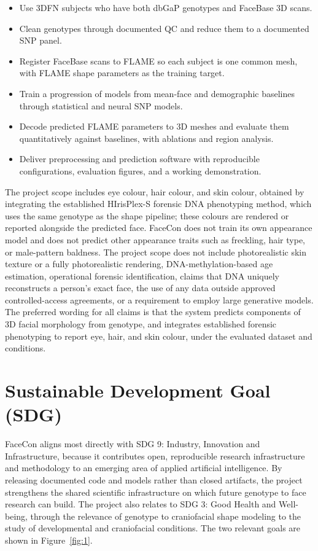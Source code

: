 \begin{itemize}
\item Use 3DFN subjects who have both dbGaP genotypes and FaceBase 3D scans.
\item Clean genotypes through documented QC and reduce them to a documented SNP panel.
\item Register FaceBase scans to FLAME so each subject is one common mesh, with FLAME shape parameters as the training target.
\item Train a progression of models from mean-face and demographic baselines through statistical and neural SNP models.
\item Decode predicted FLAME parameters to 3D meshes and evaluate them quantitatively against baselines, with ablations and region analysis.
\item Deliver preprocessing and prediction software with reproducible configurations, evaluation figures, and a working demonstration.
\end{itemize}

The project scope includes eye colour, hair colour, and skin colour, obtained by integrating the established HIrisPlex-S forensic DNA phenotyping method, which uses the same genotype as the shape pipeline; these colours are rendered or reported alongside the predicted face. FaceCon does not train its own appearance model and does not predict other appearance traits such as freckling, hair type, or male-pattern baldness. The project scope does not include photorealistic skin texture or a fully photorealistic rendering, DNA-methylation-based age estimation, operational forensic identification, claims that DNA uniquely reconstructs a person's exact face, the use of any data outside approved controlled-access agreements, or a requirement to employ large generative models. The preferred wording for all claims is that the system predicts components of 3D facial morphology from genotype, and integrates established forensic phenotyping to report eye, hair, and skin colour, under the evaluated dataset and conditions.

\section{Sustainable Development Goal (SDG)}
FaceCon aligns most directly with SDG 9: Industry, Innovation and Infrastructure, because it contributes open, reproducible research infrastructure and methodology to an emerging area of applied artificial intelligence. By releasing documented code and models rather than closed artifacts, the project strengthens the shared scientific infrastructure on which future genotype to face research can build. The project also relates to SDG 3: Good Health and Well-being, through the relevance of genotype to craniofacial shape modeling to the study of developmental and craniofacial conditions. The two relevant goals are shown in Figure~\ref{fig:1}.

